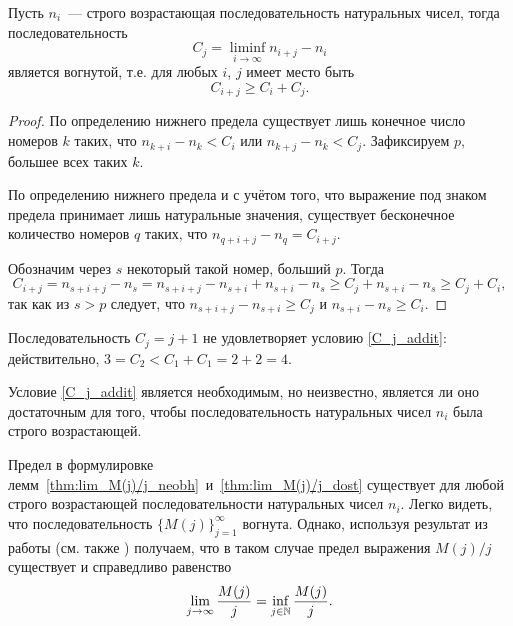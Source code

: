\begin{lemma}
	\label{lem:convex_sequence_C_j}
	Пусть $n_i$~--- строго возрастающая последовательность натуральных чисел,
	тогда последовательность
	\begin{equation}
		C_j = \liminf_{i\to\infty} n_{i+j} - n_i
	\end{equation}
	является вогнутой, т.е. для любых $i$, $j$ имеет место быть
	\begin{equation}\label{C_j_addit}
		C_{i+j} \geq C_i + C_j
		.
	\end{equation}
\end{lemma}

\begin{proof}
	По определению нижнего предела существует лишь конечное число номеров $k$
	таких, что $n_{k+i} - n_k < C_i$ или $n_{k+j} - n_k < C_j$.
	Зафиксируем $p$, большее всех таких $k$.

	По определению нижнего предела и с учётом того, что выражение под знаком предела
	принимает лишь натуральные значения,
	существует бесконечное количество номеров $q$ таких, что $n_{q+i+j} - n_q = C_{i+j}$.

	Обозначим через $s$ некоторый такой номер, больший $p$.
	Тогда
	\begin{equation}
		C_{i+j} = n_{s+i+j} - n_s = n_{s+i+j} - n_{s+i} + n_{s+i} - n_s
		\geq C_j + n_{s+i} - n_s \geq C_j + C_i,
	\end{equation}
	так как из $s>p$ следует, что $n_{s+i+j} - n_{s+i} \geq C_j$ и $n_{s+i} - n_s \geq C_i$.
\end{proof}

\begin{example}
	Последовательность $C_j = j+1$ не удовлетворяет условию \eqref{C_j_addit}:
	действительно, $3=C_2 < C_1+C_1 = 2+2 = 4$.
\end{example}

\begin{remark}
	Условие \eqref{C_j_addit} является необходимым, но неизвестно, является ли оно достаточным
	для того, чтобы последовательность натуральных чисел $n_i$ была строго возрастающей.
\end{remark}

\begin{remark}
	Предел в формулировке лемм~\ref{thm:lim_M(j)/j_neobh}~и~\ref{thm:lim_M(j)/j_dost}
	существует для любой строго возрастающей последовательности натуральных чисел $n_i$.
	Легко видеть, что последовательность $\{M(j)\}_{j=1}^\infty$ вогнута.
	Однако, используя результат из работы \cite{Fekete} (см. также \cite[I, Задача 98]{polia1978zadachi}) получаем,
	что в таком случае предел выражения $M(j)/j$ существует и справедливо равенство
	\begin{equation}
		\lim_{j\to\infty}\frac{M(j)}{j} =\inf_{j\in\mathbb{N}}\frac{M(j)}{j}
		.
	\end{equation}
\end{remark}
